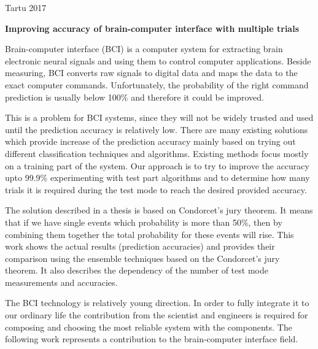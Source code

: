 \documentclass[12pt]{article}
\begin{document}
\vfill
\centerline{Tartu 2017}



\newpage
{}
\noindent\textbf{\large Improving accuracy of brain-computer interface with multiple trials}
\vspace*{2ex}
{ }

Brain-computer interface (BCI) is a computer system for extracting brain electronic neural signals and using them to control computer applications. Beside measuring, BCI converts raw signals to digital data and maps the data to the exact computer commands. Unfortunately, the probability of the right command prediction is usually below 100\% and therefore it could be improved.

This is a problem for BCI systems, since they will not be widely trusted and used until the prediction accuracy is relatively low. There are many existing solutions which provide increase of the prediction accuracy mainly based on trying out different classification techniques and algorithms. Existing methods focus mostly on a training part of the system. Our approach is to try to improve the accuracy upto 99.9\% experimenting with test part algorithms and to determine how many trials it is required during the test mode to reach the desired provided accuracy.

The solution described in a thesis is based on Condorcet's jury theorem. It means that if we have single events which probability is more than 50\%, then by combining them together the total probability for these events will rise. This work shows the actual results (prediction accuracies) and provides their comparison using the ensemble techniques based on the Condorcet's jury theorem. It also describes the dependency of the number of test mode measurements and accuracies.

The BCI technology is relatively young direction. In order to fully integrate it to our ordinary life the contribution from the scientist and engineers is required for composing and choosing the most reliable system with the components. The following work represents a contribution to the brain-computer interface field.
\end{document}
